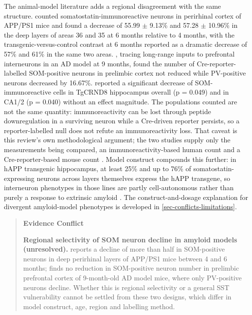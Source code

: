 \documentclass[11pt]{article}
\begin{document}
The animal-model literature adds a regional disagreement with the same structure. \citet{SanchezMejias2019} counted somatostatin-immunoreactive neurons in perirhinal cortex of APP/PS1 mice and found a decrease of 55.99 $\pm$ 9.13\% and 57.28 $\pm$ 10.96\% in the deep layers of areas 36 and 35 at 6 months relative to 4 months, with the transgenic-versus-control contrast at 6 months reported as a dramatic decrease of 57\% and 61\% in the same two areas. \citet{Ren2025}, tracing long-range inputs to prefrontal interneurons in an AD model at 9 months, found the number of Cre-reporter-labelled SOM-positive neurons in prelimbic cortex not reduced while PV-positive neurons decreased by 16.67\%. \citet{Albuquerque2015} reported a significant decrease of SOM-immunoreactive cells in TgCRND8 hippocampus overall (p = 0.049) and in CA1/2 (p = 0.040) without an effect magnitude. The populations counted are not the same quantity: immunoreactivity can be lost through peptide downregulation in a surviving neuron while a Cre-driven reporter persists, so a reporter-labelled null does not refute an immunoreactivity loss. That caveat is this review's own methodological argument; the two studies supply only the measurements being compared, an immunoreactivity-based human count \citep{GonzalezRodriguez2021} and a Cre-reporter-based mouse count \citep{Ren2025}. Model construct compounds this further: in hAPP transgenic hippocampus, at least 25\% and up to 76\% of somatostatin-expressing neurons across layers themselves express the hAPP transgene, so interneuron phenotypes in those lines are partly cell-autonomous rather than purely a response to extrinsic amyloid \citep{Hofling2019}. The construct-and-dosage explanation for divergent amyloid-model phenotypes is developed in \ref{sec-conflicts-limitations}.

\begin{quote}
\noindent\textbf{Evidence Conflict}\par
\textbf{Regional selectivity of SOM neuron decline in amyloid models (unresolved).} \citet{SanchezMejias2019} reports a decline of more than half in SOM-positive neurons in deep perirhinal layers of APP/PS1 mice between 4 and 6 months; \citet{Ren2025} finds no reduction in SOM-positive neuron number in prelimbic prefrontal cortex of 9-month-old AD model mice, where only PV-positive neurons decline. Whether this is regional selectivity or a general SST vulnerability cannot be settled from these two designs, which differ in model construct, age, region and labelling method.

\end{quote}
\end{document}
